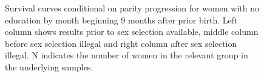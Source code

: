 \documentclass[12pt,letterpaper]{article}
\begin{document}
\begin{figure}[htpb]
{\begin{minipage}{0.31\textwidth}
        \captionsetup[subfigure]{labelformat=parens}
    \end{minipage}
}
\setcounter{subfigure}{4}
\caption{Survival curves conditional on parity progression
for women with no education by month beginning 9 months after prior birth.
Left column shows results prior to sex selection available, middle column before
sex selection illegal and right column after sex selection illegal.
N indicates the number of women in the relevant group in the underlying samples.
}
\label{fig:results_spell2_low_pps}
\end{figure}





\end{document}

